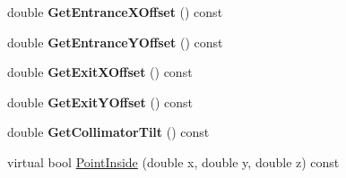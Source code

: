 \begin{DoxyCompactItemize}
\mbox{\label{classCollimatorAperture_ad7c7fb4fb80ce5c7d12a1454ae60d4f2}} 
double {\bfseries Get\+Entrance\+X\+Offset} () const
\item 
\mbox{\label{classCollimatorAperture_ac50da50f9ebdaedd28e9af235c039186}} 
double {\bfseries Get\+Entrance\+Y\+Offset} () const
\item 
\mbox{\label{classCollimatorAperture_a962112540fd88b997ab8019f0ac8c21b}} 
double {\bfseries Get\+Exit\+X\+Offset} () const
\item 
\mbox{\label{classCollimatorAperture_a871583a668abc5cb83485728a44a2f70}} 
double {\bfseries Get\+Exit\+Y\+Offset} () const
\item 
\mbox{\label{classCollimatorAperture_a642ac7c2c581c57e2bb3d817f63c7220}} 
double {\bfseries Get\+Collimator\+Tilt} () const
\item 
virtual bool \hyperlink{classCollimatorAperture_a964f63287a0ab48900859d75dfa644dc}{Point\+Inside} (double x, double y, double z) const
\end{DoxyCompactItemize}
